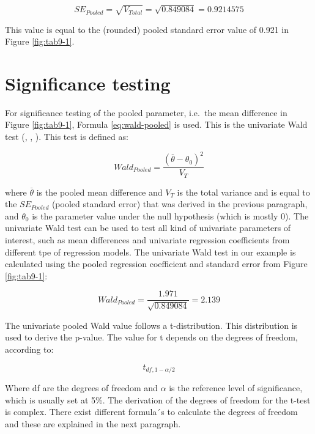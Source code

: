 \documentclass[
]{book}
\begin{document}
\[SE_{Pooled} = \sqrt{V_{Total}} = \sqrt{0.849084} = 0.9214575\]

This value is equal to the (rounded) pooled standard error value of 0.921 in Figure \ref{fig:tab9-1}.

\hypertarget{significance-testing}{%
\section{Significance testing}\label{significance-testing}}

For significance testing of the pooled parameter, i.e.~the mean difference in Figure \ref{fig:tab9-1}, Formula \eqref{eq:wald-pooled} is used. This is the univariate Wald test (\citet{Rubin1987}, \citet{VanBuuren2018}, \citet{Marshall2009MedResMeth}). This test is defined as:

\begin{equation}
Wald_{Pooled} =\frac{(\overline{\theta} - {\theta_0})^2}{V_T}
  \label{eq:wald-pooled}
\end{equation}

where \(\overline{\theta}\) is the pooled mean difference and \(V_T\) is the total variance and is equal to the \(SE_{Pooled}\) (pooled standard error) that was derived in the previous paragraph, and \(\theta_0\) is the parameter value under the null hypothesis (which is mostly 0). The univariate Wald test can be used to test all kind of univariate parameters of interest, such as mean differences and univariate regression coefficients from different tpe of regression models. The univariate Wald test in our example is calculated using the pooled regression coefficient and standard error from Figure \ref{fig:tab9-1}:

\[Wald_{Pooled} = \frac{1.971}{\sqrt{0.849084}}=2.139\]

The univariate pooled Wald value follows a t-distribution. This distribution is used to derive the p-value. The value for t depends on the degrees of freedom, according to:

\begin{equation}
t_{df,1-\alpha/2}
  \label{eq:t-distr}
\end{equation}

Where df are the degrees of freedom and \(\alpha\) is the reference level of significance, which is usually set at 5\%. The derivation of the degrees of freedom for the t-test is complex. There exist different formula´s to calculate the degrees of freedom and these are explained in the next paragraph.
\end{document}
